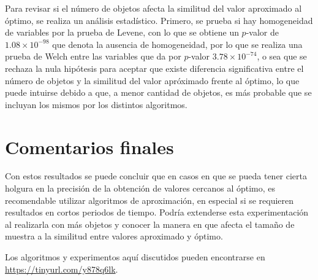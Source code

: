 \documentclass[paper=leter, fontsize=11pt]{scrartcl}
\numberwithin{equation}{section}		%
\numberwithin{figure}{section}			%
\numberwithin{table}{section}				%
\begin{document}
Para revisar si el número de objetos afecta la similitud del valor aproximado al óptimo, se realiza un análisis estadístico. Primero, se prueba si hay homogeneidad de variables por la prueba de Levene, con lo que se obtiene un $p$-valor de $1.08\times10^{-98}$ que denota la ausencia de homogeneidad, por lo que se realiza una prueba de Welch entre las variables que da por $p$-valor $3.78\times10^{-74}$, o sea que se rechaza la nula hipótesis para aceptar que existe diferencia significativa entre el número de objetos y la similitud del valor apróximado frente al óptimo, lo que puede intuirse debido a que, a menor cantidad de objetos, es más probable que se incluyan los mismos por los distintos algoritmos.

\section{Comentarios finales}
Con estos resultados se puede concluir que en casos en que se pueda tener cierta holgura en la precisión de la obtención de valores cercanos al óptimo, es recomendable utilizar algoritmos de aproximación, en especial si se requieren resultados en cortos periodos de tiempo. Podría extenderse esta experimentación al realizarla con más objetos y conocer la manera en que afecta el tamaño de muestra a la similitud entre valores aproximado y óptimo.

Los algoritmos y experimentos aquí discutidos pueden encontrarse en \url{https://tinyurl.com/y878q6lk}. 



\end{document}
